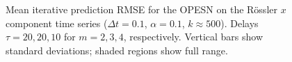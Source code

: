 \begin{figure}
    \centering

    \centering

    \caption{Mean iterative prediction RMSE for the OPESN on the Rössler $x$ component time series ($\Delta t = 0.1$, $\alpha=0.1$, $k\approx500$). Delays $\tau=20,20,10$ for $m=2,3,4$, respectively. Vertical bars show standard deviations; shaded regions show full range.}
    \label{fig:OPESN_rossler_iterative}
\end{figure}


